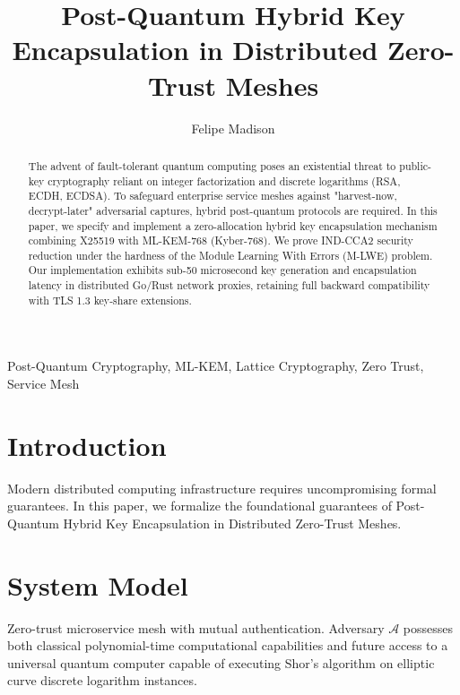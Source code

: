 \documentclass[10pt,journal,compsoc]{IEEEtran}
\begin{document}
\title{Post-Quantum Hybrid Key Encapsulation in Distributed Zero-Trust Meshes}
\author{Felipe Madison\\
}

\maketitle

\begin{abstract}
The advent of fault-tolerant quantum computing poses an existential threat to public-key cryptography reliant on integer factorization and discrete logarithms (RSA, ECDH, ECDSA). To safeguard enterprise service meshes against "harvest-now, decrypt-later" adversarial captures, hybrid post-quantum protocols are required. In this paper, we specify and implement a zero-allocation hybrid key encapsulation mechanism combining X25519 with ML-KEM-768 (Kyber-768). We prove IND-CCA2 security reduction under the hardness of the Module Learning With Errors (M-LWE) problem. Our implementation exhibits sub-50 microsecond key generation and encapsulation latency in distributed Go/Rust network proxies, retaining full backward compatibility with TLS 1.3 key-share extensions.
\end{abstract}

\begin{IEEEkeywords}
Post-Quantum Cryptography, ML-KEM, Lattice Cryptography, Zero Trust, Service Mesh
\end{IEEEkeywords}

\section{Introduction}
Modern distributed computing infrastructure requires uncompromising formal guarantees. In this paper, we formalize the foundational guarantees of Post-Quantum Hybrid Key Encapsulation in Distributed Zero-Trust Meshes.

\section{System Model}
Zero-trust microservice mesh with mutual authentication. Adversary $\mathcal{A}$ possesses both classical polynomial-time computational capabilities and future access to a universal quantum computer capable of executing Shor's algorithm on elliptic curve discrete logarithm instances.
\end{document}
